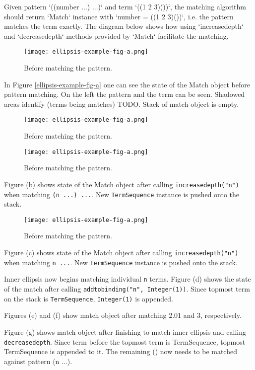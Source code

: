 Given pattern `((number ...) ...)` and term `((1 2 3)())`, the matching algorithm should return `Match` instance with `number = ((1 2 3)())`, i.e. the pattern matches the term exactly. The diagram below shows how using `increasedepth` and `decreasedepth` methods provided by `Match` facilitate the matching. 

\begin{figure}[!htbp]
\texttt{[image: ellipsis-example-fig-a.png]}
\caption{Before matching the pattern.}
\label{ellipsis-example-fig-a.png}
\end{figure}

In Figure \ref{ellipsis-example-fig-a} one can see the state of the Match object before pattern matching. On the left the pattern and the term can be seen. Shadowed areas identify (terms being matches) TODO.  Stack of match object is empty.

\begin{figure}[!htbp]
\texttt{[image: ellipsis-example-fig-a.png]}
\caption{Before matching the pattern.}
\end{figure}


\begin{figure}[!htbp]
\texttt{[image: ellipsis-example-fig-a.png]}
\caption{Before matching the pattern.}
\end{figure}



Figure (b) shows state of the Match object after calling \texttt{increasedepth("n")} when matching \texttt{(n ...) ...}. New \texttt{TermSequence} instance is pushed onto the stack.

\begin{figure}[!htbp]
\texttt{[image: ellipsis-example-fig-a.png]}
\caption{Before matching the pattern.}
\end{figure}
Figure (c) shows state of the Match object after calling \texttt{increasedepth("n")} when matching \texttt{n ...}. New \texttt{TermSequence} instance is pushed onto the stack.

Inner ellipsis now begins matching individual \texttt{n} terms. Figure (d) shows the state of the match after calling \texttt{addtobinding("n", Integer(1))}. Since topmost term on the stack is \texttt{TermSequence}, \texttt{Integer(1)} is appended.

Figures (e) and (f) show match object after matching 2.01 and 3, respectively.

Figure (g) shows match object after finishing to match inner ellipsis and calling \texttt{decreasedepth}. Since term before the topmost term is TermSequence, topmost TermSequence is appended to it. The remaining () now needs to be matched against pattern (n ...).

